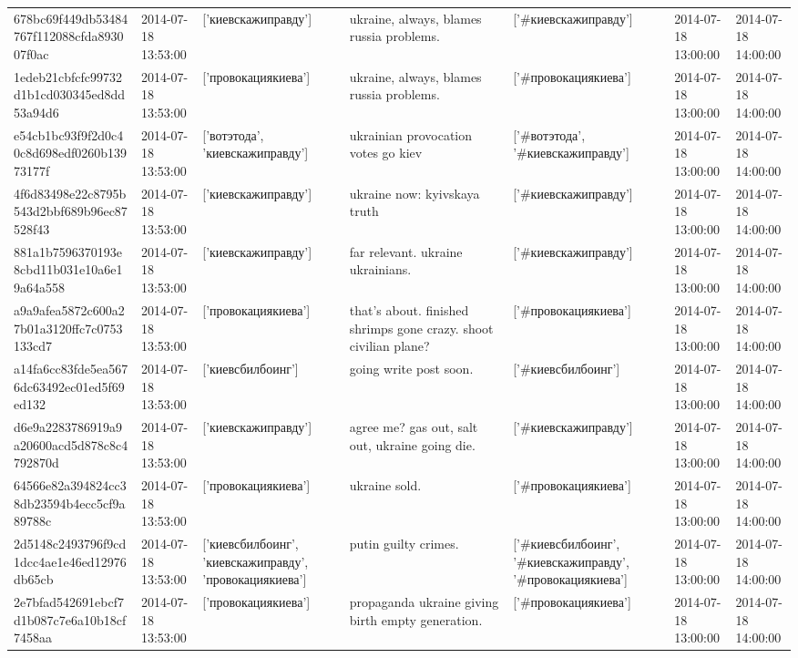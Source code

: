 \begin{tabular}{lllllll}
678bc69f449db53484767f112088cfda893007f0ac & 2014-07-18 13:53:00 & ['киевскажиправду'] & ukraine, always, blames russia problems. & ['#киевскажиправду'] & 2014-07-18 13:00:00 & 2014-07-18 14:00:00 \\
1edeb21cbfcfc99732d1b1cd030345ed8dd53a94d6 & 2014-07-18 13:53:00 & ['провокациякиева'] & ukraine, always, blames russia problems. & ['#провокациякиева'] & 2014-07-18 13:00:00 & 2014-07-18 14:00:00 \\
e54cb1bc93f9f2d0c40c8d698edf0260b13973177f & 2014-07-18 13:53:00 & ['вотэтода', 'киевскажиправду'] & ukrainian provocation votes go kiev & ['#вотэтода', '#киевскажиправду'] & 2014-07-18 13:00:00 & 2014-07-18 14:00:00 \\
4f6d83498e22c8795b543d2bbf689b96ec87528f43 & 2014-07-18 13:53:00 & ['киевскажиправду'] & ukraine now: kyivskaya truth & ['#киевскажиправду'] & 2014-07-18 13:00:00 & 2014-07-18 14:00:00 \\
881a1b7596370193e8cbd11b031e10a6e19a64a558 & 2014-07-18 13:53:00 & ['киевскажиправду'] & far relevant. ukraine ukrainians. & ['#киевскажиправду'] & 2014-07-18 13:00:00 & 2014-07-18 14:00:00 \\
a9a9afea5872c600a27b01a3120ffc7c0753133cd7 & 2014-07-18 13:53:00 & ['провокациякиева'] & that's about. finished shrimps gone crazy. shoot civilian plane? & ['#провокациякиева'] & 2014-07-18 13:00:00 & 2014-07-18 14:00:00 \\
a14fa6cc83fde5ea5676dc63492ec01ed5f69ed132 & 2014-07-18 13:53:00 & ['киевсбилбоинг'] & going write post soon. & ['#киевсбилбоинг'] & 2014-07-18 13:00:00 & 2014-07-18 14:00:00 \\
d6e9a2283786919a9a20600acd5d878c8c4792870d & 2014-07-18 13:53:00 & ['киевскажиправду'] & agree me? gas out, salt out, ukraine going die. & ['#киевскажиправду'] & 2014-07-18 13:00:00 & 2014-07-18 14:00:00 \\
64566e82a394824cc38db23594b4ecc5cf9a89788c & 2014-07-18 13:53:00 & ['провокациякиева'] & ukraine sold. & ['#провокациякиева'] & 2014-07-18 13:00:00 & 2014-07-18 14:00:00 \\
2d5148c2493796f9cd1dcc4ae1e46ed12976db65cb & 2014-07-18 13:53:00 & ['киевсбилбоинг', 'киевскажиправду', 'провокациякиева'] & putin guilty crimes. & ['#киевсбилбоинг', '#киевскажиправду', '#провокациякиева'] & 2014-07-18 13:00:00 & 2014-07-18 14:00:00 \\
2e7bfad542691ebcf7d1b087c7e6a10b18cf7458aa & 2014-07-18 13:53:00 & ['провокациякиева'] & propaganda ukraine giving birth empty generation. & ['#провокациякиева'] & 2014-07-18 13:00:00 & 2014-07-18 14:00:00 \\

\end{tabular}
